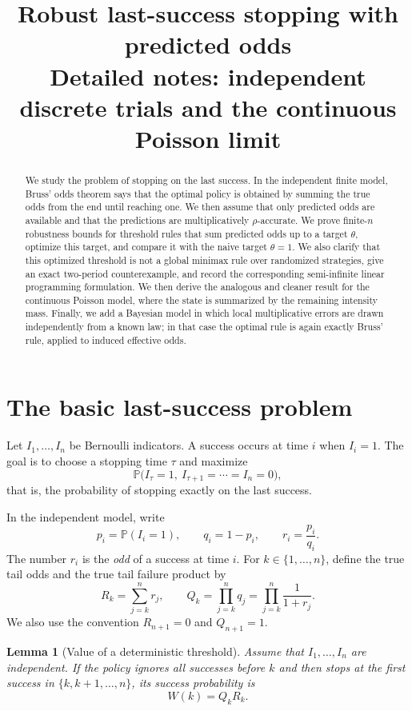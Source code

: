 \documentclass[11pt,a4paper]{article}
\title{Robust last-success stopping with predicted odds\\
\large Detailed notes: independent discrete trials and the continuous Poisson limit}
\author{}
\date{}
\newtheorem{lemma}{Lemma}
\begin{document}
\maketitle

\begin{abstract}
We study the problem of stopping on the last success.  In the independent
finite model, Bruss' odds theorem says that the optimal policy is obtained by
summing the true odds from the end until reaching one.  We then assume that only
predicted odds are available and that the predictions are multiplicatively
\(\rho\)-accurate.  We prove finite-\(n\) robustness bounds for threshold rules
that sum predicted odds up to a target \(\theta\), optimize this target, and
compare it with the naive target \(\theta=1\).  We also clarify that this optimized threshold is not a global minimax rule over randomized strategies, give an exact two-period counterexample, and record the corresponding semi-infinite linear programming formulation.  We then derive the analogous and
cleaner result for the continuous Poisson model, where the state is summarized
by the remaining intensity mass.  Finally, we add a Bayesian model in which local
multiplicative errors are drawn independently from a known law; in that case the
optimal rule is again exactly Bruss' rule, applied to induced effective odds.
\end{abstract}

\section{The basic last-success problem}

Let \(I_1,\dots,I_n\) be Bernoulli indicators.  A success occurs at time \(i\)
when \(I_i=1\).  The goal is to choose a stopping time \(\tau\) and maximize
\[
  \mathbb P\bigl(I_\tau=1,\ I_{\tau+1}=\cdots=I_n=0\bigr),
\]
that is, the probability of stopping exactly on the last success.

In the independent model, write
\[
  p_i=\mathbb P(I_i=1),\qquad q_i=1-p_i,\qquad
  r_i=\frac{p_i}{q_i}.
\]
The number \(r_i\) is the \emph{odd} of a success at time \(i\).  For
\(k\in\{1,\dots,n\}\), define the true tail odds and the true tail failure
product by
\[
  R_k=\sum_{j=k}^n r_j,\qquad
  Q_k=\prod_{j=k}^n q_j=\prod_{j=k}^n \frac1{1+r_j}.
\]
We also use the convention \(R_{n+1}=0\) and \(Q_{n+1}=1\).

\begin{lemma}[Value of a deterministic threshold]
\label{lem:threshold-value}
Assume that \(I_1,\dots,I_n\) are independent.  If the policy ignores all
successes before \(k\) and then stops at the first success in
\(\{k,k+1,\dots,n\}\), its success probability is
\[
  W(k)=Q_kR_k.
\]
\end{lemma}
\end{document}
